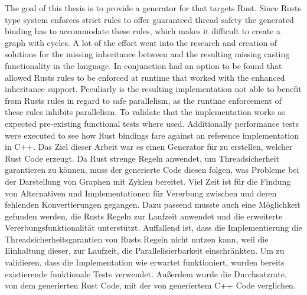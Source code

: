 \documentclass[thesis]{subfiles}
\begin{document}
{
\let\cleardoublepage\relax
{}
The goal of this thesis is to provide a generator for  that targets Rust.
Since Rusts type system enforces strict rules to offer guaranteed thread safety the generated binding has to accommodate these rules, which makes it difficult to create a graph with cycles.
A lot of the effort went into the research and creation of solutions for the missing inheritance between \structs and the resulting missing casting functionality in the language.
In conjunction had an option to be found that allowed Rusts rules to be enforced at runtime that worked with the enhanced inheritance support.
Peculiarly is the resulting implementation not able to benefit from Rusts rules in regard to safe parallelism, as the runtime enforcement of these rules inhibits parallelism.
To validate that the implementation works as expected pre-existing functional tests where used.
Additionally performance tests were executed to see how Rust bindings fare against an reference implementation in C++.
}
Das Ziel dieser Arbeit war es einen Generator für  zu erstellen, welcher Rust Code erzeugt.
Da Rust strenge Regeln anwendet, um Threadsicherheit garantieren zu können, muss der generierte Code diesen folgen, was Probleme bei der Darstellung von Graphen mit Zyklen bereitet.
Viel Zeit ist für die Findung von Alternativen und Implementationen für Vererbung zwischen \structs und deren fehlenden Konvertierungen gegangen.
Dazu passend musste auch eine Möglichkeit gefunden werden, die Rusts Regeln zur Laufzeit anwendet und die erweiterte Vererbungsfunktionalität unterstützt.
Auffallend ist, dass die Implementierung die Threadsicherheitsgarantien von Rusts Regeln  nicht nutzen kann, weil die Einhaltung dieser, zur Laufzeit, die Parallelisierbarkeit einschränkten.
Um zu validieren, dass die Implementation wie erwartet funktioniert, wurden bereits existierende funktionale Tests verwendet.
Außerdem wurde die Durchsatzrate, von dem generierten Rust Code, mit der von generiertem C++ Code verglichen.
\end{document}
